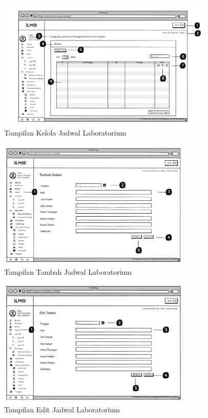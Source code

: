 \begin{figure}[h]
	\centering
	\includegraphics[width=0.92\textwidth]{konten/gambar/user interface/ui-jadwal.png}
	\caption{Tampilan Kelola Jadwal Laboratorium}
	\label{fig:kelola-jadwal}
\end{figure}

\begin{figure}
	\centering
	\includegraphics[width=0.82\textwidth]{konten/gambar/tambah-jadwal.png}
	\caption{Tampilan Tambah Jadwal Laboratorium}
	\label{fig:tambah-jadwal-interface}
\end{figure}

\begin{figure}
	\centering
	\includegraphics[width=0.82\textwidth]{konten/gambar/user interface/edit-jadwal.png}
	\caption{Tampilan Edit Jadwal Laboratorium}
	\label{fig:edit-jadwal-interface}
\end{figure}

